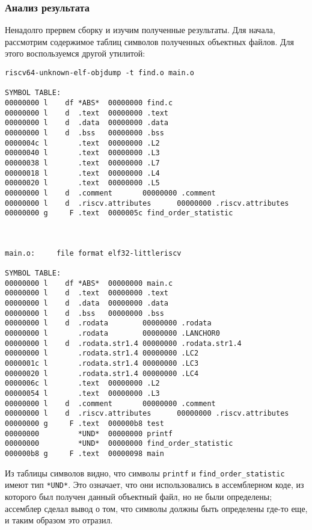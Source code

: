     \subsubsection{Анализ результата}\label{subsubsec:analysis}
    Ненадолго прервем сборку и изучим полученные результаты. Для начала, рассмотрим содержимое таблиц символов полученных объектных файлов. Для этого воспользуемся другой утилитой:
    \begin{Verbatim}[breaklines=true]
riscv64-unknown-elf-objdump -t find.o main.o

SYMBOL TABLE:
00000000 l    df *ABS*  00000000 find.c
00000000 l    d  .text  00000000 .text
00000000 l    d  .data  00000000 .data
00000000 l    d  .bss   00000000 .bss
0000004c l       .text  00000000 .L2
00000040 l       .text  00000000 .L3
00000038 l       .text  00000000 .L7
00000018 l       .text  00000000 .L4
00000020 l       .text  00000000 .L5
00000000 l    d  .comment       00000000 .comment
00000000 l    d  .riscv.attributes      00000000 .riscv.attributes
00000000 g     F .text  0000005c find_order_statistic



main.o:     file format elf32-littleriscv

SYMBOL TABLE:
00000000 l    df *ABS*  00000000 main.c
00000000 l    d  .text  00000000 .text
00000000 l    d  .data  00000000 .data
00000000 l    d  .bss   00000000 .bss
00000000 l    d  .rodata        00000000 .rodata
00000000 l       .rodata        00000000 .LANCHOR0
00000000 l    d  .rodata.str1.4 00000000 .rodata.str1.4
00000000 l       .rodata.str1.4 00000000 .LC2
0000001c l       .rodata.str1.4 00000000 .LC3
00000020 l       .rodata.str1.4 00000000 .LC4
0000006c l       .text  00000000 .L2
00000054 l       .text  00000000 .L3
00000000 l    d  .comment       00000000 .comment
00000000 l    d  .riscv.attributes      00000000 .riscv.attributes
00000000 g     F .text  000000b8 test
00000000         *UND*  00000000 printf
00000000         *UND*  00000000 find_order_statistic
000000b8 g     F .text  00000098 main
    \end{Verbatim}
    Из таблицы символов видно, что символы \verb|printf| и \verb|find_order_statistic| имеют тип \verb|*UND*|. Это означает, что они использовались в ассемблерном коде, из которого был получен данный объектный файл, но не были определены; ассемблер сделал вывод о том, что символы должны быть определены где-то еще, и таким образом это отразил.

